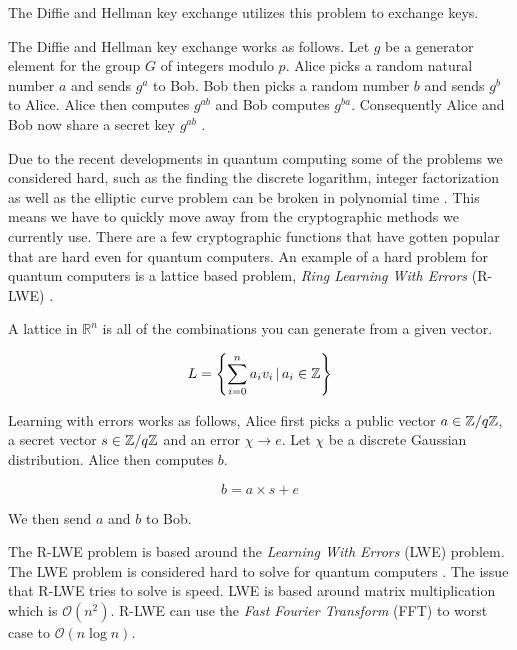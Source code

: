 The Diffie and Hellman key exchange utilizes this problem to exchange keys.

\begin{definition}

    The Diffie and Hellman key exchange works as follows. Let $g$ be a generator
    element for the group $G$ of integers modulo $p$. Alice picks a random
    natural number $a$ and sends $g^a$ to Bob. Bob then picks a random number
    $b$ and sends $g^b$ to Alice. Alice then computes $g^{ab}$ and Bob computes
    $g^{ba}$. Consequently Alice and Bob now share a secret key $g^{ab}$
    \citep{FranciscoRodriguez-Henriquez10}.

\end{definition}

Due to the recent developments in quantum computing some of the problems we
considered hard, such as the finding the discrete logarithm, integer
factorization as well as the elliptic curve problem can be broken in polynomial
time \citep{ShorQuantum}. This means we have to quickly move away from the
cryptographic methods we currently use. There are a few cryptographic functions
that have gotten popular that are hard even for quantum computers. An example
of a hard problem for quantum computers is a lattice based problem,
\textit{Ring Learning With Errors} (R-LWE)
\citep{FPGA_Post_Quantum_Primitives}.

\begin{definition}
    A lattice in $\mathbb{R}^n$ is all of the combinations you can generate
    from a given vector.

    \[L = \left\{ \sum_{i = 0}^n a_iv_i \, | \, a_i \in \mathbb{Z} \right\}\]
\end{definition}

\begin{definition}
    Learning with errors works as follows, Alice first picks a public vector
    $a \in \mathbb{Z} / q\mathbb{Z}$, a secret vector $s \in \mathbb{Z} / q\mathbb{Z}$ and an error $\chi
    \rightarrow e$. Let $\chi$ be a discrete Gaussian distribution.  Alice then
    computes $b$.

    \[ b = a \times s + e \]

    We then send $a$ and $b$ to Bob.
\end{definition}

The R-LWE problem is based around the \textit{Learning With Errors} (LWE)
problem. The LWE problem is considered hard to solve for quantum computers
\citep{Regev05}. The issue that R-LWE tries to solve is speed. LWE is based
around matrix multiplication which is $\mathcal{O}(n^2)$. R-LWE can use the
\textit{Fast Fourier Transform} (FFT) to worst case to $\mathcal{O}(n\log n)$.

